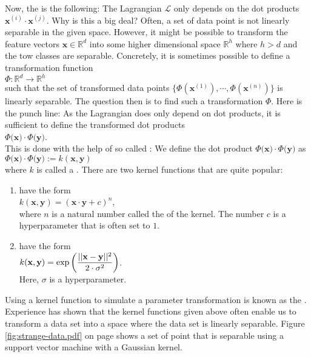 Now, the  is the following:  The Lagrangian $\mathcal{L}$ only depends on the dot
products $\mathbf{x}^{(i)} \cdot \mathbf{x}^{(j)}$.  Why is this a big deal?  Often, a set of data point is not
linearly separable in the given space.  However, it might be possible to transform the feature vectors
$\mathbf{x} \in \mathbb{R}^d$ into some higher dimensional space $\mathbb{R}^h$ where $h > d$ and the tow
classes are separable.  Concretely, it is sometimes possible to define a transformation function
\\[0.2cm]
\hspace*{1.3cm}
$\Phi: \mathbb{R}^d \rightarrow \mathbb{R}^h$
\\[0.2cm]
such that the set of transformed data points
$\bigl\{\Phi(\mathbf{x}^{(1)}), \cdots, \Phi(\mathbf{x}^{(n)})\bigr\}$ is linearly separable.
The question then is to find such a transformation $\Phi$.  Here is the punch line:  As the Lagrangian does
only depend on dot products, it is sufficient to define the transformed dot products
\\[0.2cm]
\hspace*{1.3cm}
$\Phi\bigl(\mathbf{x}\bigr) \cdot \Phi\bigl(\mathbf{y}\bigr) $.
\\[0.2cm]
This is done with the help of so called :  We define the dot product
$\Phi\bigl(\mathbf{x}\bigr) \cdot \Phi\bigl(\mathbf{y}\bigr)$ as
\\[0.2cm]
\hspace*{1.3cm}
$\Phi\bigl(\mathbf{x}\bigr) \cdot \Phi\bigl(\mathbf{y}\bigr) := k(\mathbf{x}, \mathbf{y})$
\\[0.2cm]
where $k$ is called a .  There are two kernel functions that are quite popular:
\begin{enumerate}
\item {} have the form
      \\[0.2cm]
      \hspace*{1.3cm}
      $k(\mathbf{x}, \mathbf{y}) = (\mathbf{x} \cdot \mathbf{y} + c)^n$,
      \\[0.2cm]
      where $n$ is a natural number called the  of the kernel.
      The number $c$ is a hyperparameter that is often set to $1$.
\item {} have the form
      \\[0.2cm]
      \hspace*{1.3cm}
      $\displaystyle k(\mathbf{x}, \mathbf{y}) = \exp\left( \frac{||\mathbf{x}-\mathbf{y}||^2}{2 \cdot \sigma^2}\right)$.
      \\[0.2cm]
      Here, $\sigma$ is a hyperparameter.  
\end{enumerate}
Using a kernel function to simulate a parameter transformation is known as the .    
Experience has shown that the kernel functions given above often enable us to transform a data set into a space where the
data set is linearly separable.  Figure \ref{fig:strange-data.pdf} on page \pageref{fig:strange-data.pdf} shows
a set of point that is separable using a support vector machine with a Gaussian kernel.


